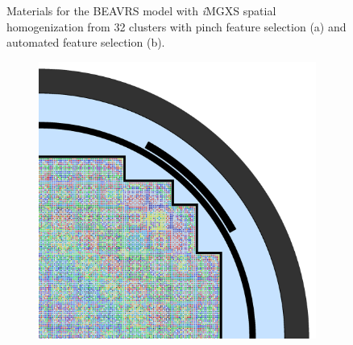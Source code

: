 \begin{figure}[h!]
\begin{subfigure}{0.68\textwidth}
  \caption{}
  \label{fig:chap10-full-core-combined-32}
\end{subfigure}
\caption[Materials for BEAVRS with clustering homogenization (32 clusters)]{Materials for the \ac{BEAVRS} model with \textit{i}\ac{MGXS} spatial homogenization from 32 clusters with pinch feature selection (a) and automated feature selection (b).}
\label{fig:chap10-full-core-geometries-32}
\end{figure}

\clearpage

\begin{figure}[h!]
\centering
\begin{subfigure}{0.68\textwidth}
  \centering
  \includegraphics[width=\linewidth]{figures/unsupervised/geometries/with-features/64-clusters/pinch/full-core}
  \caption{}
  \label{fig:chap10-full-core-pinch-64}
\end{subfigure}
\begin{subfigure}{0.68\textwidth}
  \centering

\end{subfigure}
\end{figure}
